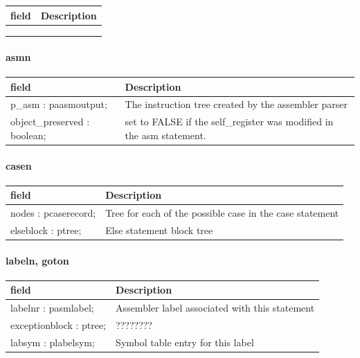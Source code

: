 \documentclass [12pt]{article}
\begin{document}
\begin{longtable}{|l|p{10cm}|}
\hline
field	& Description \\
\hline
\endhead
\hline
\endfoot
  &  \\
  &  \\
  &  
\end{longtable}

\paragraph{asmn}\mbox{}

\begin{longtable}{|l|p{10cm}|}
\hline
field	& Description \\
\hline
\endhead
\hline
\endfoot
\textsf{p{\_}asm : paasmoutput;}& 
The instruction tree created by the assembler parser \\
\textsf{object{\_}preserved : boolean;}& 
set to FALSE if the self{\_}register was modified in the asm statement.  
\label{tab29}
\end{longtable}

\paragraph{casen}\mbox{}

\begin{longtable}{|l|p{10cm}|}
\hline
field	& Description \\
\hline
\endhead
\hline
\endfoot
\textsf{nodes : pcaserecord;}& 
Tree for each of the possible case in the case statement \\
\textsf{elseblock : ptree;}& 
Else statement block tree 
\label{tab30}
\end{longtable}

\paragraph{labeln, goton}\mbox{}

\begin{longtable}{|l|p{10cm}|}
\hline
field	& Description \\
\hline
\endhead
\hline
\endfoot
\textsf{labelnr : pasmlabel;}   & Assembler label associated with this statement \\
\textsf{exceptionblock : ptree;}& ???????? \\
\textsf{labsym : plabelsym;}    & Symbol table entry for this label 
\label{tab31}
\end{longtable}
\end{document}
